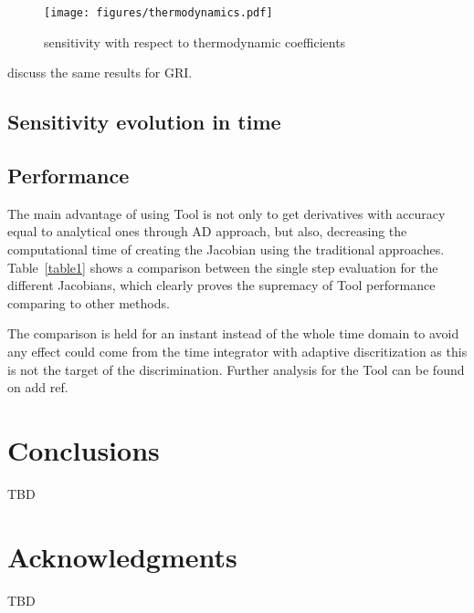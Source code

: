 \documentclass[preprint,review,12pt]{elsarticle}
\begin{document}
\begin{figure}
\centering
 {\texttt{[image: figures/thermodynamics.pdf]}}
\caption{sensitivity with respect to thermodynamic coefficients}
    \label{fig:figure10}
\end{figure}
 {\color{red} discuss the same results for GRI}.
\subsection{Sensitivity evolution in time}

\subsection{Performance}
The main advantage of using {\color{red} Tool} is not only to get derivatives with accuracy equal to analytical ones through AD approach, but also, decreasing the computational time of creating the Jacobian using the traditional approaches. Table~\ref{table1} shows a comparison between the single step evaluation for the different Jacobians, which clearly proves the supremacy of   {\color{red} Tool}  performance comparing to other methods. 


The comparison is held for an instant instead of the whole time domain to avoid any effect could come from the time integrator with adaptive discritization as this is not the target of the discrimination. Further analysis for the {\color{red} Tool} can be found on {\color{red} add ref}.

\section{Conclusions}
\label{Conclusions}

TBD

\section*{Acknowledgments}
\label{Acknowledgments}

TBD 



\end{document}
